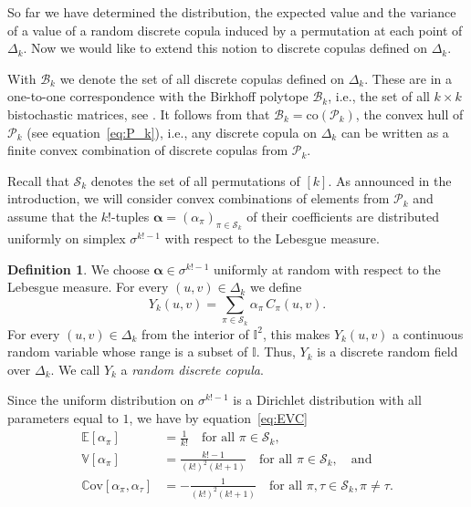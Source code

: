 \documentclass[12pt,a4paper]{amsart}
\theoremstyle{definition}
\newtheorem{definition}[theorem]{Definition}
\newcommand{\II}{\mathbb{I}}
\newcommand{\DK}{\Delta_k}
\newcommand{\SK}{\mathcal{S}_k}
\newcommand{\PK}{\mathcal{P}_k}
\newcommand{\EE}{\mathbb{E}}
\newcommand{\VV}{\mathbb{V}}
\newcommand{\Cov}{\mathbb{C}\mathrm{ov}}
\newcommand{\BK}{\mathcal{B}_k}
\newcommand{\aaa}{\boldsymbol{\alpha}}
\begin{document}
So far we have determined the distribution, the expected value and the variance of a value of a random discrete copula induced by a permutation at each point of $\DK$. Now we would like to extend this notion to discrete copulas defined on $\DK$. 

With $\BK$ we denote the set of all discrete copulas defined on $\DK$. These are in a one-to-one correspondence with the Birkhoff polytope $\mathscr{B}_k$, i.e., the set of all $k \times k$ bistochastic matrices, see \cite[Proposition~2]{KolMesMordSem06}. It follows from \cite[Proposition~4]{KolMesMordSem06} that $\BK = \textrm{co}(\PK)$, the convex hull of $\PK$ (see equation~\eqref{eq:P_k}), i.e., any discrete copula on $\DK$ can be written as a finite convex combination of discrete copulas from $\PK$.

Recall that $\SK$ denotes the set of all permutations of $[k]$. As announced in the introduction, we will consider convex combinations of elements from $\PK$ and assume that the $k!$-tuples $\aaa=(\alpha_\pi)_{\pi \in \SK}$ of their coefficients are distributed uniformly on simplex $\sigma^{k!-1}$ with respect to the Lebesgue measure.

\begin{definition}\label{def:Y_k}
We choose $\aaa \in \sigma^{k!-1}$ uniformly at random with respect to the Lebesgue measure.  For every $(u,v) \in \DK$ we define
$$Y_k(u,v)= \sum_{\pi\in \SK} \alpha_\pi \, C_{\pi}(u,v).$$
For every $(u,v) \in \DK$ from the interior of $\II^2$, this makes $Y_k(u,v)$ a continuous random variable whose range is a subset of $\II$. Thus, $Y_k$ is a discrete random field over $\DK$. We call $Y_k$ a \emph{random discrete copula}.
\end{definition}

 Since the uniform distribution on $\sigma^{k!-1}$ is a Dirichlet distribution with all parameters equal to $1$, we have by equation~\eqref{eq:EVC} 
\begin{equation}\label{eq:EVC_uni}
\begin{aligned}
    \EE[\alpha_\pi] &=\frac{1}{k!} \quad\text{for all } \pi \in \SK, \\
    \VV[\alpha_\pi] &=\frac{k!-1}{(k!)^2(k!+1)} \quad\text{for all } \pi \in \SK, \quad \text{and}\\
    \Cov[\alpha_\pi,\alpha_\tau] &=-\frac{1}{(k!)^2(k!+1)} \quad \text{for all } \pi, \tau \in \SK, \pi \ne \tau.
\end{aligned}
\end{equation}
\end{document}
